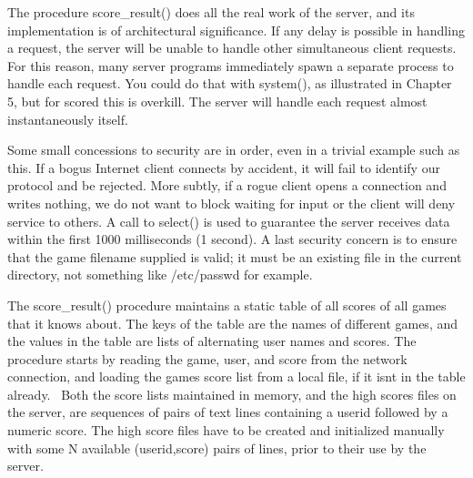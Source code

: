 The procedure \textsf{score\_result()} does all the real work of the
server, and its implementation is of architectural significance. If any
delay is possible in handling a request, the server will be unable to
handle other simultaneous client requests. For this reason, many server
programs immediately spawn a separate process to handle each request.
You could do that with \textsf{system()}, as illustrated in Chapter 5,
but for \textsf{scored} this is overkill. The server will handle each
request almost instantaneously itself.

Some small concessions to security are in order, even in a trivial
example such as this. If a bogus Internet client connects by accident,
it will fail to identify our protocol and be rejected. More subtly, if
a rogue client opens a connection and writes nothing, we do not want to
block waiting for input or the client will deny service to others. A
call to select() is used to guarantee the server receives data within
the first 1000 milliseconds (1 second). A last security concern is to
ensure that the {\textquotedbl}game{\textquotedbl} filename supplied is
valid; it must be an existing file in the current directory, not
something like \textsf{/etc/passwd} for example. 

The \textsf{score\_result()} procedure maintains a static table of all
scores of all games that it knows about. The keys of the table are the
names of different games, and the values in the table are lists of
alternating user names and scores. The procedure starts by reading the
game, user, and score from the network connection, and loading the
game{\textquotesingle}s score list from a local file, if it
isn{\textquotesingle}t in the table already. \ Both the score lists
maintained in memory, and the high scores files on the server, are
sequences of pairs of text lines containing a userid followed by a
numeric score. The high score files have to be created and initialized
manually with some N available (userid,score) pairs of lines, prior to
their use by the server.

